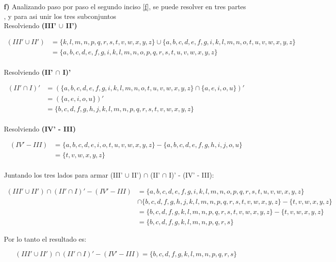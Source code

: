 \newpage

\textbf{f)} Analizando paso por paso el segundo inciso \ref{f}, se puede resolver en tres partes \textbf{} , \textbf{} y \textbf{} para asi unir los tres subconjuntos \\

Resolviendo \textbf{(III' $\cup$ II')}

\begin{align*}
(III' \cup II')  &= \{ k, l, m, n, p, q, r, s, t, v, w, x, y, z \} \cup  \{ a, b, c, d, e, f, g, i, k, l, m, n, o, t, u, v, w, x, y, z \} \\
  &=   \{ a, b, c, d, e, f, g, i, k, l, m, n, o, p, q, r, s, t, u, v, w, x, y, z \}       \\
\end{align*}

Resolviendo \textbf{(II' $\cap$ I)' }

\begin{align*}
(II' \cap I)'   &= (\{ a, b, c, d, e, f, g, i, k, l, m, n, o, t, u, v, w, x, y, z \} \cap \{a, e, i, o, u\})' \\
  &=  ( \{a, e, i, o, u\} )' \\
  &= \{ b, c, d, f, g, h, j, k, l, m, n, p, q, r, s, t, v, w, x, y, z \}  \\
\end{align*}


Resolviendo \textbf{(IV' - III)}

\begin{align*}
(IV' - III)  &= \{ a, b, c, d, e, i, o, t, u, v, w, x, y, z \} - \{ a, b, c, d, e, f, g, h, i, j, o, u  \} \\
  &=  \{ t, v, w, x, y, z \}  \\
\end{align*}

Juntando los tres lados para armar (III' $\cup$ II') $\cap$ (II' $\cap$ I)' - (IV' - III):

\begin{align*}
(III' \cup II') \cap (II' \cap I)' - (IV' - III) &= \{ a, b, c, d, e, f, g, i, k, l, m, n, o, p, q, r, s, t, u, v, w, x, y, z \} \\ &\cap \{ b, c, d, f, g, h, j, k, l, m, n, p, q, r, s, t, v, w, x, y, z \}  - \{ t, v, w, x, y, z \}  \\
  &=  \{b, c, d,  f, g, k, l, m, n, p, q, r, s, t, v, w, x, y, z \} 
 - \{ t, v, w, x, y, z \} \\
 &=  \{  b, c, d, f, g, k, l, m, n, p, q, r, s      \} 
\end{align*}

Por lo tanto el resultado es:

\begin{equation*}
    \boxed{(III' \cup II') \cap (II' \cap I)' - (IV' - III)  =  \{  b, c, d, f, g, k, l, m, n, p, q, r, s      \}    }
\end{equation*}